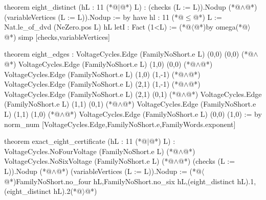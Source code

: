 theorem eight_distinct (hL : 11 (*@$\mid$@*) L) :
    (checks (L := L)).Nodup (*@$\land$@*) (variableVertices (L := L)).Nodup := by
  have hl : 11 (*@$\le$@*) L := Nat.le_of_dvd (NeZero.pos L) hL
  letI : Fact (1<L) := (*@$\langle$@*)by omega(*@$\rangle$@*)
  simp [checks,variableVertices]

theorem eight_edges :
    VoltageCycles.Edge (FamilyNoShort.e L) (0,0) (0,0) (*@$\land$@*)
    VoltageCycles.Edge (FamilyNoShort.e L) (1,0) (0,0) (*@$\land$@*)
    VoltageCycles.Edge (FamilyNoShort.e L) (1,0) (1,-1) (*@$\land$@*)
    VoltageCycles.Edge (FamilyNoShort.e L) (2,1) (1,-1) (*@$\land$@*)
    VoltageCycles.Edge (FamilyNoShort.e L) (2,1) (0,1) (*@$\land$@*)
    VoltageCycles.Edge (FamilyNoShort.e L) (1,1) (0,1) (*@$\land$@*)
    VoltageCycles.Edge (FamilyNoShort.e L) (1,1) (1,0) (*@$\land$@*)
    VoltageCycles.Edge (FamilyNoShort.e L) (0,0) (1,0) := by
  norm_num [VoltageCycles.Edge,FamilyNoShort.e,FamilyWords.exponent]

theorem exact_eight_certificate (hL : 11 (*@$\mid$@*) L) :
    VoltageCycles.NoFourVoltage (FamilyNoShort.e L) (*@$\land$@*)
    VoltageCycles.NoSixVoltage (FamilyNoShort.e L) (*@$\land$@*)
    (checks (L := L)).Nodup (*@$\land$@*) (variableVertices (L := L)).Nodup :=
  (*@$\langle$@*)FamilyNoShort.no_four hL,FamilyNoShort.no_six hL,(eight_distinct hL).1,(eight_distinct hL).2(*@$\rangle$@*)

